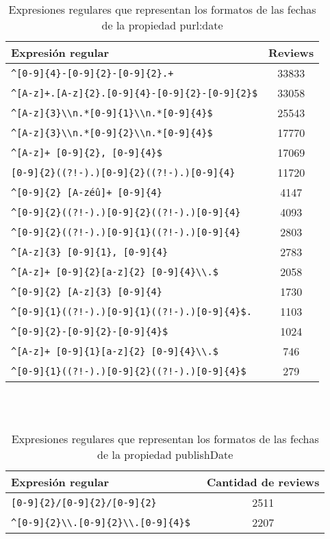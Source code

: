 \begin{table}[h]
\begin{tabular}{| l | c |}\hline
Expresión regular & Reviews\\\hline
\verb|^[0-9]{4}-[0-9]{2}-[0-9]{2}.+| & 33833\\
\verb|^[A-z]+.[A-z]{2}.[0-9]{4}-[0-9]{2}-[0-9]{2}$| & 33058\\
\verb|^[A-z]{3}\\n.*[0-9]{1}\\n.*[0-9]{4}$| & 25543\\
\verb|^[A-z]{3}\\n.*[0-9]{2}\\n.*[0-9]{4}$| & 17770\\
\verb|^[A-z]+ [0-9]{2}, [0-9]{4}$| & 17069\\
\verb|[0-9]{2}((?!-).)[0-9]{2}((?!-).)[0-9]{4}| & 11720\\
\verb|^[0-9]{2} [A-zéû]+ [0-9]{4}| & 4147\\
\verb|^[0-9]{2}((?!-).)[0-9]{2}((?!-).)[0-9]{4}| & 4093\\
\verb|^[0-9]{2}((?!-).)[0-9]{1}((?!-).)[0-9]{4}| & 2803\\
\verb|^[A-z]{3} [0-9]{1}, [0-9]{4}| & 2783\\
\verb|^[A-z]+ [0-9]{2}[a-z]{2} [0-9]{4}\\.$| & 2058\\
\verb|^[0-9]{2} [A-z]{3} [0-9]{4}| & 1730\\
\verb|^[0-9]{1}((?!-).)[0-9]{1}((?!-).)[0-9]{4}$.| & 1103\\
\verb|^[0-9]{2}-[0-9]{2}-[0-9]{4}$| & 1024\\
\verb|^[A-z]+ [0-9]{1}[a-z]{2} [0-9]{4}\\.$| & 746\\
\verb|^[0-9]{1}((?!-).)[0-9]{2}((?!-).)[0-9]{4}$| & 279\\\hline
\end{tabular}
\caption{Expresiones regulares que representan los formatos de las fechas de la propiedad purl:date}
\label{table:RegExpressionsDate}
\end{table}\\
\\
\begin{table}[h]
\begin{tabular}{| l | c |}\hline
Expresión regular & Cantidad de reviews\\\hline
\verb|[0-9]{2}/[0-9]{2}/[0-9]{2} |& 2511\\
\verb|^[0-9]{2}\\.[0-9]{2}\\.[0-9]{4}$ |& 2207\\\hline
\end{tabular}
\caption{Expresiones regulares que representan los formatos de las fechas de la propiedad publishDate}
\label{table:RegExpressionsPublishDate}
\end{table}\\
